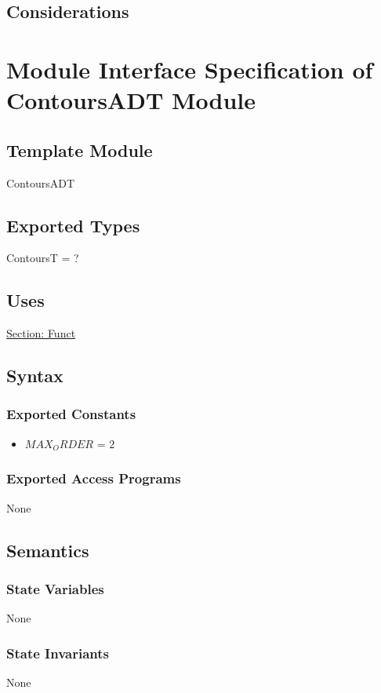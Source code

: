 \documentclass[12pt]{article}
\begin{document}
\subsection{Considerations}
\label{Sec:Considerations}
\section{Module Interface Specification of ContoursADT Module}
\label{Sec:ContoursADT}
\subsection{Template Module}
\label{Sec:TemplateModule}
ContoursADT
\subsection{Exported Types}
\label{Sec:ExpTypes}
ContoursT = ?
\subsection{Uses}
\label{Sec:Uses}
\hyperref[Sec:FunctADT]{Section: Funct}
\subsection{Syntax}
\label{Sec:Syntax}
\subsubsection{Exported Constants}
\label{Sec:ExpConstants}
\begin{itemize}
\item{$MAX_ORDER$ = $2$}
\end{itemize}
\subsubsection{Exported Access Programs}
\label{Sec:ExpAccPrograms}
None
\subsection{Semantics}
\label{Sec:Semantics}
\subsubsection{State Variables}
\label{Sec:StateVars}
None
\subsubsection{State Invariants}
\label{Sec:StateInvars}
None
\end{document}
